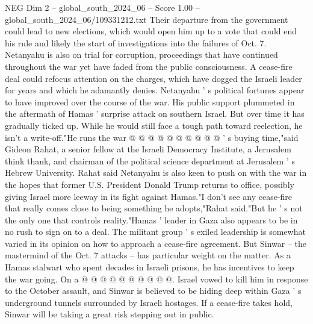 \begin{textsample}{NEG Dim 2 – global\_south\_2024\_06 – Score 1.00 – global\_south\_2024\_06/109331212.txt}
Their departure from the government could lead to new elections, which would open him up to a vote that could end his rule and likely the start of investigations into the failures of Oct. 7.
Netanyahu is also on trial for corruption, proceedings that have continued throughout the war yet have faded from the public consciousness.
A cease-fire deal could refocus attention on the charges, which have dogged the Israeli leader for years and which he adamantly denies.
Netanyahu ' s political fortunes appear to have improved over the course of the war.
His public support plummeted in the aftermath of Hamas ' surprise attack on southern Israel.
But over time it has gradually ticked up.
While he would still face a tough path toward reelection, he isn't a write-off."He runs the war @ @ @ @ @ @ @ @ @ @ ' s buying time,"said Gideon Rahat, a senior fellow at the Israeli Democracy Institute, a Jerusalem think thank, and chairman of the political science department at Jerusalem ' s Hebrew University.
Rahat said Netanyahu is also keen to push on with the war in the hopes that former U.S.
President Donald Trump returns to office, possibly giving Israel more leeway in its fight against Hamas."I don't see any cease-fire that really comes close to being something he adopts,"Rahat said."But he ' s not the only one that controls reality."Hamas ' leader in Gaza also appears to be in no rush to sign on to a deal.
The militant group ' s exiled leadership is somewhat varied in its opinion on how to approach a cease-fire agreement.
But Sinwar -- the mastermind of the Oct. 7 attacks -- has particular weight on the matter.
As a Hamas stalwart who spent decades in Israeli prisons, he has incentives to keep the war going.
On a @ @ @ @ @ @ @ @ @ @.
Israel vowed to kill him in response to the October assault, and Sinwar is believed to be hiding deep within Gaza ' s underground tunnels surrounded by Israeli hostages.
If a cease-fire takes hold, Sinwar will be taking a great risk stepping out in public.

\end{textsample}
